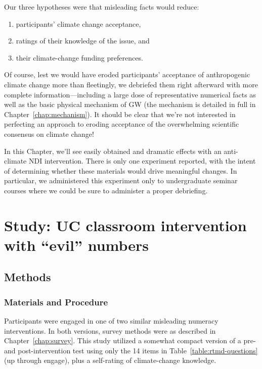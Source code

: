 Our three hypotheses were that misleading facts would reduce:
\begin{enumerate}
    \item participants’ climate change acceptance, 
    \item ratings of their knowledge of the issue, and 
    \item their climate-change funding preferences.
\end{enumerate}
Of course, lest we would have eroded participants’ acceptance of anthropogenic
climate change more than fleetingly, we debriefed them right afterward with more
complete information---including a large dose of representative numerical facts
as well as the basic physical mechanism of GW (the mechanism is detailed in full
in Chapter~\ref{chap:mechanism}). It should be clear that we're not interested
in perfecting an approach to eroding acceptance of the overwhelming scientific
consensus on climate change! 

In this Chapter, we'll see easily obtained and dramatic effects with an
anti-climate NDI intervention. There is only one experiment reported, with the
intent of determining whether these materials would drive meaningful
changes. In particular, we administered this experiment only to undergraduate
seminar courses where we could be sure to administer a proper debriefing.

\section{Study: UC classroom intervention with \texorpdfstring{“evil”}{"evil"}
    numbers}

\subsection{Methods} 
\label{sec:evilndi-methods}

\subsubsection{Materials and Procedure}

Participants were engaged in one of two similar misleading numeracy
interventions. In both versions, survey methods were as described in
Chapter~\ref{chap:survey}. This study utilized a somewhat compact version of a
pre- and post-intervention test using only the 14 items in
Table~\ref{table:rtmd-questions} (up through \textsf{engage}), plus a
self-rating of climate-change knowledge.  

